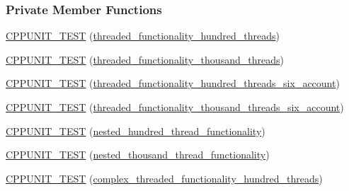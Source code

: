 \subsubsection*{Private Member Functions}
\begin{DoxyCompactItemize}
\item 
\hyperlink{class_my_test_c_ase_ab20fea05727a78fe4c6663032df5f910_ab20fea05727a78fe4c6663032df5f910}{C\+P\+P\+U\+N\+I\+T\+\_\+\+T\+E\+ST} (\hyperlink{class_my_test_c_ase_afdb39bda80c1305ac1c4cc0e5ce022f4_afdb39bda80c1305ac1c4cc0e5ce022f4}{threaded\+\_\+functionality\+\_\+hundred\+\_\+threads})
\item 
\hyperlink{class_my_test_c_ase_aa7230b64f391ddc9d42787d6710fe564_aa7230b64f391ddc9d42787d6710fe564}{C\+P\+P\+U\+N\+I\+T\+\_\+\+T\+E\+ST} (\hyperlink{class_my_test_c_ase_a03f867cf5e2295e4055fe88d825b1710_a03f867cf5e2295e4055fe88d825b1710}{threaded\+\_\+functionality\+\_\+thousand\+\_\+threads})
\item 
\hyperlink{class_my_test_c_ase_a4e110dab660b4b63ec89ee58d1e44c09_a4e110dab660b4b63ec89ee58d1e44c09}{C\+P\+P\+U\+N\+I\+T\+\_\+\+T\+E\+ST} (\hyperlink{class_my_test_c_ase_acdc0278b6fa7c0102b9e5cdfb68a41a1_acdc0278b6fa7c0102b9e5cdfb68a41a1}{threaded\+\_\+functionality\+\_\+hundred\+\_\+threads\+\_\+six\+\_\+account})
\item 
\hyperlink{class_my_test_c_ase_aa0173ddb3fd4951247cfaaade0c9548b_aa0173ddb3fd4951247cfaaade0c9548b}{C\+P\+P\+U\+N\+I\+T\+\_\+\+T\+E\+ST} (\hyperlink{class_my_test_c_ase_ab7d15a71958588c6402f234e106668b1_ab7d15a71958588c6402f234e106668b1}{threaded\+\_\+functionality\+\_\+thousand\+\_\+threads\+\_\+six\+\_\+account})
\item 
\hyperlink{class_my_test_c_ase_a5419a4e3fdf581d37e740631d24f339f_a5419a4e3fdf581d37e740631d24f339f}{C\+P\+P\+U\+N\+I\+T\+\_\+\+T\+E\+ST} (\hyperlink{class_my_test_c_ase_a13635e729bf660619c7f6a75b414bc3f_a13635e729bf660619c7f6a75b414bc3f}{nested\+\_\+hundred\+\_\+thread\+\_\+functionality})
\item 
\hyperlink{class_my_test_c_ase_ab31dd163acdbc4b7592872ee9c658517_ab31dd163acdbc4b7592872ee9c658517}{C\+P\+P\+U\+N\+I\+T\+\_\+\+T\+E\+ST} (\hyperlink{class_my_test_c_ase_a3937532fe2a85f7e61518b8abffdb09a_a3937532fe2a85f7e61518b8abffdb09a}{nested\+\_\+thousand\+\_\+thread\+\_\+functionality})
\item 
\hyperlink{class_my_test_c_ase_aff9753ab243b154152b9a2a5e9521ac5_aff9753ab243b154152b9a2a5e9521ac5}{C\+P\+P\+U\+N\+I\+T\+\_\+\+T\+E\+ST} (\hyperlink{class_my_test_c_ase_a8a198d6ef96a8a07ea7fa839ad068ffb_a8a198d6ef96a8a07ea7fa839ad068ffb}{complex\+\_\+threaded\+\_\+functionality\+\_\+hundred\+\_\+threads})

\end{DoxyCompactItemize}
